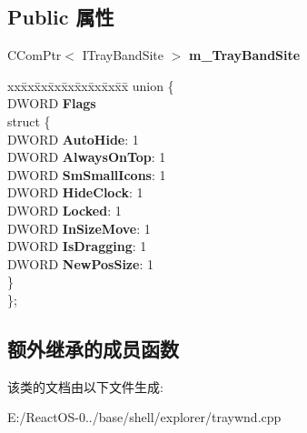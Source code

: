 \subsection*{Public 属性}
\begin{DoxyCompactItemize}
\item 
\mbox{\label{class_c_tray_window_a2e5d8bc2d3da660d7d0d343690b1cac4}} 
C\+Com\+Ptr$<$ I\+Tray\+Band\+Site $>$ {\bfseries m\+\_\+\+Tray\+Band\+Site}
\item 
\mbox{\label{class_c_tray_window_ae7e07aa846ffb353a6500c0f67ed696b}} 
\begin{tabbing}
xx\=xx\=xx\=xx\=xx\=xx\=xx\=xx\=xx\=\kill
union \{\\
\>DWORD {\bfseries Flags}\\
\mbox{\label{union_c_tray_window_1_1_0D88_a5b74b48f653bd90505136bb2048dfcf6}} 
\>struct \{\\
\>\>DWORD {\bfseries AutoHide}: 1\\
\>\>DWORD {\bfseries AlwaysOnTop}: 1\\
\>\>DWORD {\bfseries SmSmallIcons}: 1\\
\>\>DWORD {\bfseries HideClock}: 1\\
\>\>DWORD {\bfseries Locked}: 1\\
\>\>DWORD {\bfseries InSizeMove}: 1\\
\>\>DWORD {\bfseries IsDragging}: 1\\
\>\>DWORD {\bfseries NewPosSize}: 1\\
\>\} \\
\}; \\

\end{tabbing}\end{DoxyCompactItemize}
\subsection*{额外继承的成员函数}


该类的文档由以下文件生成\+:\begin{DoxyCompactItemize}
\item 
E\+:/\+React\+O\+S-\/0../base/shell/explorer/traywnd.\+cpp\end{DoxyCompactItemize}
